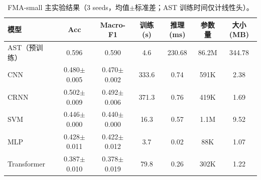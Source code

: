 \begin{table}[H]
\centering\small
\caption{FMA-small 主实验结果（3 seeds，均值$\pm$标准差；AST 训练时间仅计线性头）。}
\label{tab:fma}
\begin{tabular}{lcccccc}
\toprule
模型 & Acc & Macro-F1 & 训练(s) & 推理(ms) & 参数量 & 大小(MB)\\
\midrule
AST（预训练） & 0.596 & 0.590 & 4.6 & 230.68 & 86.2M & 344.78\\
CNN & 0.480$\pm$0.005 & 0.470$\pm$0.002 & 333.6 & 0.74 & 591K & 2.38\\
CRNN & 0.502$\pm$0.009 & 0.492$\pm$0.006 & 371.3 & 0.76 & 419K & 1.69\\
SVM & 0.446$\pm$0.000 & 0.440$\pm$0.000 & 16.3 & 0.57 & 1.1M & 9.52\\
MLP & 0.428$\pm$0.011 & 0.422$\pm$0.012 & 3.7 & 0.02 & 88K & 1.07\\
Transformer & 0.387$\pm$0.010 & 0.378$\pm$0.019 & 79.8 & 0.26 & 302K & 1.22\\
\bottomrule
\end{tabular}
\end{table}
